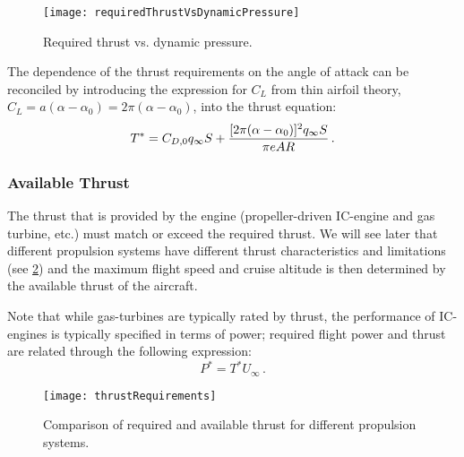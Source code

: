 \begin{figure}[!b!]
\begin{center}
 \texttt{[image: requiredThrustVsDynamicPressure]}
 \caption{\label{FIG_THRUST_REQUIREMENT}Required thrust vs. dynamic pressure.}
\end{center}
\end{figure}
 
The dependence of the thrust requirements on the angle of attack can be reconciled by introducing the expression for $C_L$ from thin airfoil theory, $C_L = a(\alpha-\alpha_0) = 2\pi (\alpha-\alpha_0)$, into the thrust equation:
\begin{equation}
  T^\ast = C_{D,0}q_\infty S + {\frac{[2\pi(\alpha-\alpha_0)]^2q_\infty S}{\pi e AR}} \, \text{.}
\end{equation}

\subsubsection{Available Thrust}
The thrust that is provided by the engine (propeller-driven IC-engine and gas turbine, etc.) must match or exceed the required thrust. We will see later that different propulsion systems have different thrust characteristics and limitations (see \cref{FIG_THRUST_REQUIREMENT_AVAIL}) and the maximum flight speed and cruise altitude is then determined by the available thrust of the aircraft.

Note that while gas-turbines are typically rated by thrust, the performance of IC-engines is typically specified in terms of power; required flight power and thrust are related through the following expression:
\begin{equation}
  P^\ast = T^\ast U_\infty \, \text{.}
\end{equation}

\begin{figure}[htb]
  \begin{center}
    \texttt{[image: thrustRequirements]}
    \caption{\label{FIG_THRUST_REQUIREMENT_AVAIL}Comparison of required and available thrust for different propulsion systems.}
  \end{center}
\end{figure}

